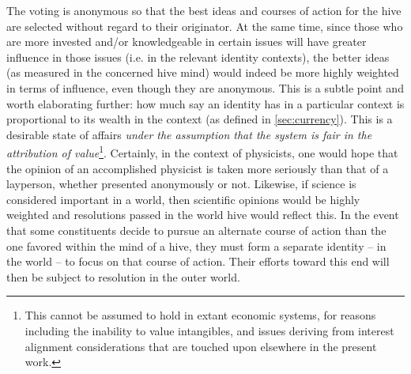 \documentclass[pra,twocolumn,groupedaddress,10pt]{revtex4}
\theoremstyle{definition}
\begin{document}
The voting is anonymous so that the best ideas and courses of action for the hive are selected without regard to their originator. At the same time, since those who are more invested and/or knowledgeable in certain issues will have greater influence in those issues (i.e. in the relevant identity contexts), the better ideas (as measured in the concerned hive mind) would indeed be more highly weighted in terms of influence, even though they are anonymous. This is a subtle point and worth elaborating further: how much say an identity has in a particular context is proportional to its wealth in the context (as defined in \autoref{sec:currency}). This is a desirable state of affairs \textit{under the assumption that the system is fair in the attribution of value}\footnote{This cannot be assumed to hold in extant economic systems, for reasons including the inability to value intangibles, and issues deriving from interest alignment considerations that are touched upon elsewhere in the present work.}. Certainly, in the context of physicists, one would hope that the opinion of an accomplished physicist is taken more seriously than that of a layperson, whether presented anonymously or not. Likewise, if science is considered important in a world, then scientific opinions would be highly weighted and resolutions passed in the world hive would reflect this. In the event that some constituents decide to pursue an alternate course of action than the one favored within the mind of a hive, they must form a separate identity -- in the world -- to focus on that course of action. Their efforts toward this end will then be subject to resolution in the outer world.
\end{document}
